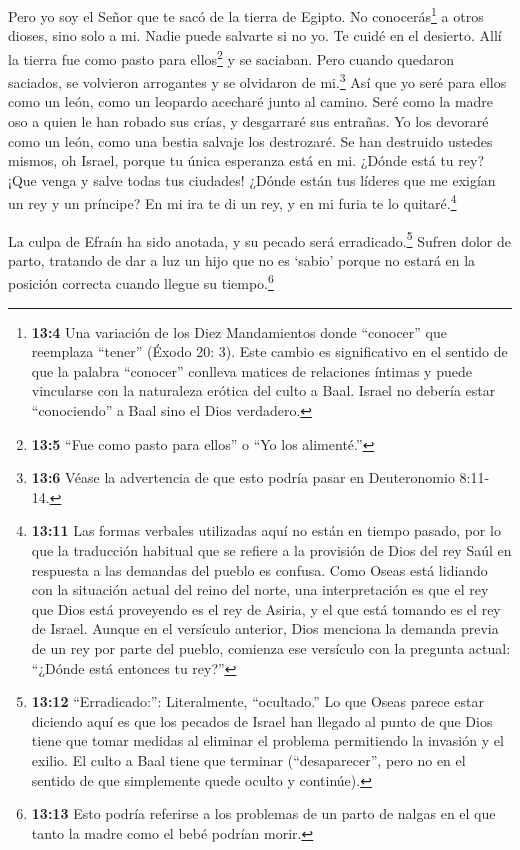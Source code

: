  Pero yo soy el Señor que te sacó de la tierra de Egipto. No
conocerás\footnote{\textbf{13:4} Una variación de los Diez Mandamientos
  donde ``conocer'' que reemplaza ``tener'' (Éxodo 20: 3). Este cambio
  es significativo en el sentido de que la palabra ``conocer'' conlleva
  matices de relaciones íntimas y puede vincularse con la naturaleza
  erótica del culto a Baal. Israel no debería estar ``conociendo'' a
  Baal sino el Dios verdadero.} a otros dioses, sino solo a mi. Nadie
puede salvarte si no yo.  Te cuidé en el desierto. Allí la
tierra fue como pasto para ellos\footnote{\textbf{13:5} ``Fue como pasto
  para ellos'' o ``Yo los alimenté.''}  y se saciaban. Pero
cuando quedaron saciados, se volvieron arrogantes y se olvidaron de
mi.\footnote{\textbf{13:6} Véase la advertencia de que esto podría pasar
  en Deuteronomio 8:11-14.}  Así que yo seré para ellos como
un león, como un leopardo acecharé junto al camino.  Seré
como la madre oso a quien le han robado sus crías, y desgarraré sus
entrañas. Yo los devoraré como un león, como una bestia salvaje los
destrozaré.  Se han destruido ustedes mismos, oh Israel,
porque tu única esperanza está en mi.  ¿Dónde está tu rey?
¡Que venga y salve todas tus ciudades! ¿Dónde están tus líderes que me
exigían un rey y un príncipe?  En mi ira te di un rey, y en
mi furia te lo quitaré.\footnote{\textbf{13:11} Las formas verbales
  utilizadas aquí no están en tiempo pasado, por lo que la traducción
  habitual que se refiere a la provisión de Dios del rey Saúl en
  respuesta a las demandas del pueblo es confusa. Como Oseas está
  lidiando con la situación actual del reino del norte, una
  interpretación es que el rey que Dios está proveyendo es el rey de
  Asiria, y el que está tomando es el rey de Israel. Aunque en el
  versículo anterior, Dios menciona la demanda previa de un rey por
  parte del pueblo, comienza ese versículo con la pregunta actual:
  ``¿Dónde está entonces tu rey?''}

 La culpa de Efraín ha sido anotada, y su pecado será
erradicado.\footnote{\textbf{13:12} ``Erradicado:'': Literalmente,
  ``ocultado.'' Lo que Oseas parece estar diciendo aquí es que los
  pecados de Israel han llegado al punto de que Dios tiene que tomar
  medidas al eliminar el problema permitiendo la invasión y el exilio.
  El culto a Baal tiene que terminar (``desaparecer'', pero no en el
  sentido de que simplemente quede oculto y continúe).} 
Sufren dolor de parto, tratando de dar a luz un hijo que no es `sabio'
porque no estará en la posición correcta cuando llegue su
tiempo.\footnote{\textbf{13:13} Esto podría referirse a los problemas de
  un parto de nalgas en el que tanto la madre como el bebé podrían
  morir.}

